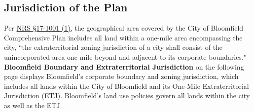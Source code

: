 \pagebreak
\subsection{Jurisdiction of the Plan}
\noindent Per \href{https://nebraskalegislature.gov/laws/statutes.php?statute=17-1001}{NRS \S17-1001 (1)}, the geographical area covered by the City of Bloomfield Comprehensive Plan includes all land within a one-mile area encompassing the city, ``the extraterritorial zoning jurisdiction of a city shall consist of the unincorporated area one mile beyond and adjacent to its corporate boundaries."\\

\noindent \textbf{Bloomfield Boundary and Extraterritorial Jurisdiction} on the following page displays Bloomfield's corporate boundary and zoning jurisdiction, which includes all lands within the City of Bloomfield and its One-Mile Extraterritorial Jurisdiction (ETJ). Bloomfield's land use policies govern all lands within the city as well as the ETJ.

\pagebreak
\begin{landscape}
    
\end{landscape}
\pagebreak